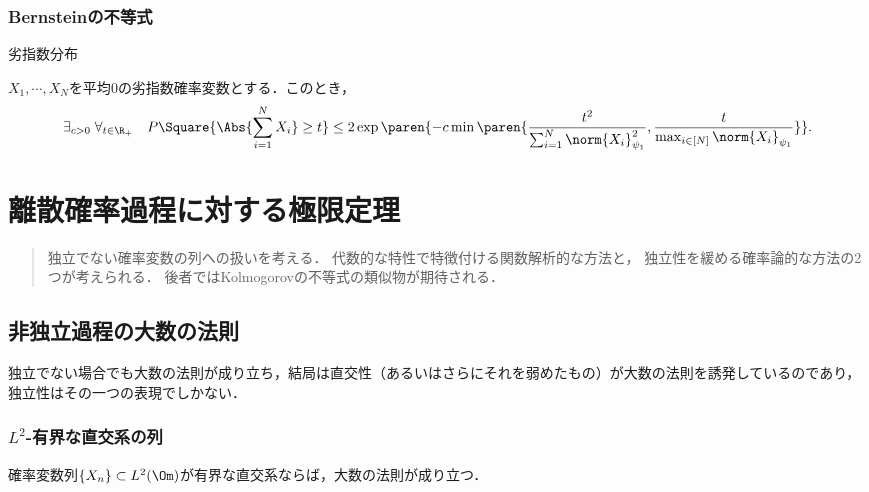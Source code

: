 \documentclass[uplatex,dvipdfmx]{jsreport}
\begin{document}
\subsection{Bernsteinの不等式}

\begin{tcolorbox}[colframe=ForestGreen, colback=ForestGreen!10!white,breakable,colbacktitle=ForestGreen!40!white,coltitle=black,fonttitle=\bfseries\sffamily,
title=]
    劣指数分布
\end{tcolorbox}

\begin{theorem}
    $X_1,\cdots,X_N$を平均$0$の劣指数確率変数とする．このとき，
    \[\exists_{c>0}\;\forall_{t\in\R_+}\quad P\Square{\Abs{\sum^N_{i=1}X_i}\ge t}\le 2\exp\paren{-c\min\paren{\frac{t^2}{\sum^N_{i=1}\norm{X_i}^2_{\psi_1}},\frac{t}{\max_{i\in[N]}\norm{X_i}_{\psi_1}}}}.\]
\end{theorem}

\chapter{離散確率過程に対する極限定理}

\begin{quotation}
    独立でない確率変数の列への扱いを考える．
    代数的な特性で特徴付ける関数解析的な方法と，
    独立性を緩める確率論的な方法の2つが考えられる．
    後者ではKolmogorovの不等式の類似物が期待される．
\end{quotation}

\section{非独立過程の大数の法則}

\begin{tcolorbox}[colframe=ForestGreen, colback=ForestGreen!10!white,breakable,colbacktitle=ForestGreen!40!white,coltitle=black,fonttitle=\bfseries\sffamily,
title=]
    独立でない場合でも大数の法則が成り立ち，結局は直交性（あるいはさらにそれを弱めたもの）が大数の法則を誘発しているのであり，独立性はその一つの表現でしかない．
\end{tcolorbox}

\subsection{$L^2$-有界な直交系の列}

\begin{tcolorbox}[colframe=ForestGreen, colback=ForestGreen!10!white,breakable,colbacktitle=ForestGreen!40!white,coltitle=black,fonttitle=\bfseries\sffamily,
title=]
    確率変数列$\{X_n\}\subset L^2(\Om)$が有界な直交系ならば，大数の法則が成り立つ．
\end{tcolorbox}
\end{document}
